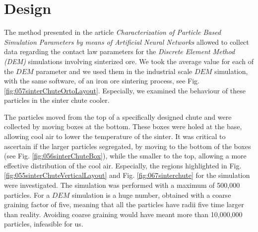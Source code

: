 

\section{Design}
\label{sec:design}



The method presented in the article \textit{Characterization of Particle Based Simulation Parameters
by means of Artificial Neural Networks} allowed to collect data
regarding the contact law parameters
for the \textit{Discrete Element Method (DEM)} simulations involving sinterized
ore.
We took the average value for each of the $DEM$ parameter and we used them 
in the industrial scale $DEM$ simulation, with the same software, 
of an iron ore sintering process, see Fig. \ref{fig:057sinterChuteOrtoLayout}.
Especially, we examined the behaviour of these particles in the sinter chute
cooler.



The particles moved from the top of a specifically designed chute and were 
collected by moving boxes at the bottom. These boxes were holed at the base, 
allowing cool air to lower the temperature of the sinter. 
It was critical to ascertain if the larger particles segregated, 
by moving to the bottom of the boxes (see Fig. \ref{fig:056sinterChuteBox}), while the smaller to the top,
allowing a more effective distribution of the cool air. 
Especially, the regions
highlighted in Fig. \ref{fig:055sinterChuteVerticalLayout} and
Fig. \ref{fig:067sinterchute} for the simulation were investigated.
The simulation was performed with a maximum of 500,000 particles.
For a $DEM$ simulation is a huge number, obtained with a coarse graining factor
of five, meaning that all the particles have radii five time larger than reality.
Avoiding coarse graining would have meant more than 10,000,000 particles,
infeasible for us.





